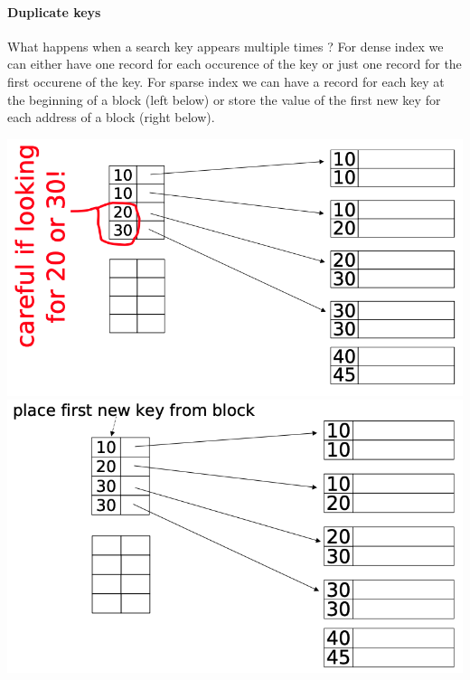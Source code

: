 \documentclass[12pt,a4paper]{article}
\begin{document}
\paragraph{Duplicate keys}
What happens when a search key appears multiple times ? For dense index we can either have one record for each occurence of the key or just one record for the first occurene of the key. For sparse index we can have a record for each key at the beginning of a block (left below) or store the value of the first new key for each address of a block (right below).
\begin{center}
\includegraphics[scale=0.25]{img/img26.png}
\includegraphics[scale=0.25]{img/img27.png}
\end{center}
\end{document}
